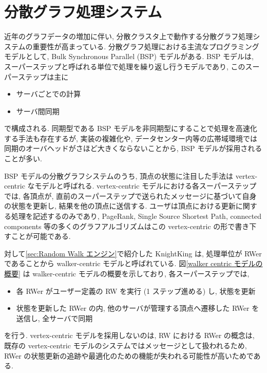 \section{分散グラフ処理システム}

近年のグラフデータの増加に伴い, 分散クラスタ上で動作する分散グラフ処理システムの重要性が高まっている. 分散グラフ処理における主流なプログラミングモデルとして, Bulk Synchronous Parallel (BSP) モデルがある. BSP モデルは, スーパーステップと呼ばれる単位で処理を繰り返し行うモデルであり, このスーパーステップは主に
\begin{itemize}
    \item サーバごとでの計算
    \item サーバ間同期
\end{itemize}
で構成される. 同期型である BSP モデルを非同期型にすることで処理を高速化する手法も存在する\cite{BAP}\cite{AAP}\cite{Gluon-Async}が, 実装の複雑化や, データセンター内等の広帯域環境では同期のオーバヘッドがさほど大きくならないことから, BSP モデルが採用されることが多い. 

BSP モデルの分散グラフシステムのうち, 頂点の状態に注目した手法\cite{Pregel}\cite{10.1145/2741948.2741970}\cite{10.5555/2387880.2387883}\cite{10.5555/3026877.3026901}\cite{Gluon}は vertex-centric なモデルと呼ばれる. vertex-centric モデルにおける各スーパーステップでは, 各頂点が, 直前のスーパーステップで送られたメッセージに基づいて自身の状態を更新し, 結果を他の頂点に送信する. ユーザは頂点における更新に関する処理を記述するのみであり, PageRank, Single Source Shortest Path, connected components 等の多くのグラフアルゴリズムはこの vertex-centric の形で書き下すことが可能である. 

対して\ref{sec:Random Walk エンジン}で紹介した KnightKing は, 処理単位が RWer であることから walker-centric モデルと呼ばれている. 図\ref{walker centric モデルの概要} は walker-centric モデルの概要を示しており, 各スーパーステップでは, 
\begin{itemize}
    \item 各 RWer がユーザー定義の RW を実行 (1 ステップ進める) し, 状態を更新
    \item 状態を更新した RWer の内, 他のサーバが管理する頂点へ遷移した RWer を送信し, 全サーバで同期
\end{itemize}
を行う. vertex-centric モデルを採用しないのは, RW における RWer の概念は, 既存の vertex-centric モデルのシステムではメッセージとして扱われるため, RWer の状態更新の追跡や最適化のための機能が失われる可能性が高いためである. 

